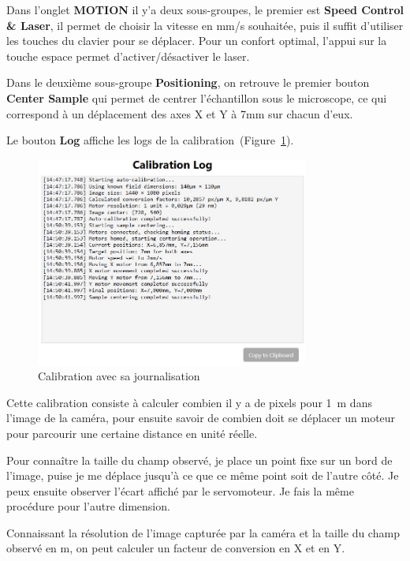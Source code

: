 Dans l'onglet \textcolor[RGB]{241,158,56}{\textbf{MOTION}} il y'a deux sous-groupes, le premier est \textbf{Speed Control \& Laser}, il permet de choisir la vitesse en mm/s souhaitée, puis il suffit d'utiliser les touches du clavier pour se déplacer. Pour un confort optimal, l'appui sur la touche espace permet d'activer/désactiver le laser.

\newpage
Dans le deuxième sous-groupe \textbf{Positioning}, on retrouve le premier bouton \textcolor[RGB]{241,158,56}{\textbf{Center Sample}} qui permet de centrer l'échantillon sous le microscope, ce qui correspond à un déplacement des axes X et Y à 7mm sur chacun d'eux.

Le bouton \textcolor[RGB]{102,125,138}{\textbf{Log}} affiche les logs de la calibration~(Figure~\ref{Calibration_Center_logs}).
\begin{figure}[H]
    \centering
    \includegraphics[width=0.8\textwidth]{assets/figures/Application_ServoVision/Calibration_Center_logs.jpeg}
    \caption{Calibration avec sa journalisation}
    \label{Calibration_Center_logs}
\end{figure}
Cette calibration consiste à calculer combien il y a de pixels pour 1~\textmu m dans l'image de la caméra, pour ensuite savoir de combien doit se déplacer un moteur pour parcourir une certaine distance en unité réelle.

Pour connaître la taille du champ observé, je place un point fixe sur un bord de l'image, puise je me déplace jusqu'à ce que ce même point soit de l'autre côté. Je peux ensuite observer l'écart affiché par le servomoteur. Je fais la même procédure pour l'autre dimension.

Connaissant la résolution de l'image capturée par la caméra et la taille du champ observé en \textmu m, on peut calculer un facteur de conversion en X et en Y.

